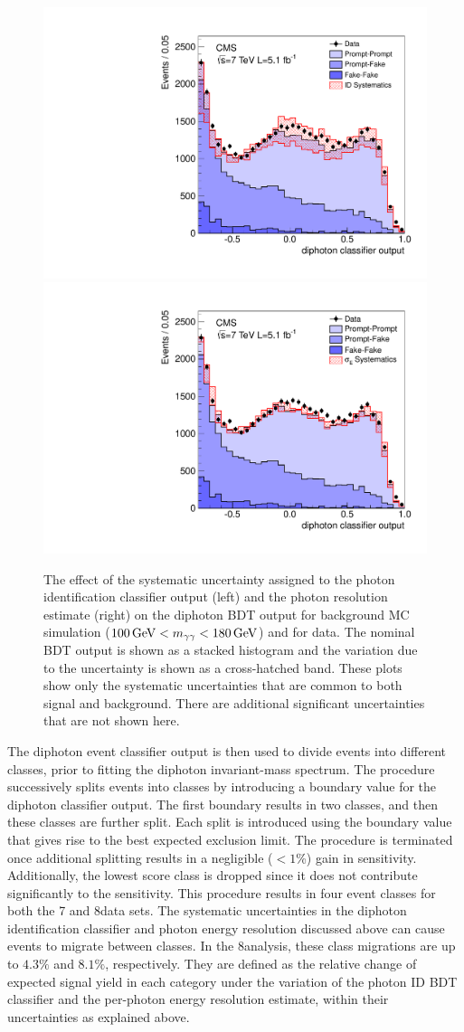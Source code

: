 \documentclass[11pt,twoside,a4paper,cmspaper,final,collab]{cms-tdr}
\begin{document}
\begin{figure}[htbp]
  \begin{center}
    \includegraphics[width=0.49\linewidth]{figures/hgg_phmvanomid_7TeV}
    \includegraphics[width=0.49\linewidth]{figures/hgg_phmvanomsige_7TeV}
    \caption{
      The effect of the systematic uncertainty assigned to the photon
      identification classifier output (left) and
      the photon resolution estimate (right)
      on the diphoton BDT output for background MC simulation ($100\,\text{Ge\hspace{-.08em}V}<m_{\gamma\gamma}<180\,\text{Ge\hspace{-.08em}V}$) and for data.
      The nominal BDT output is shown as a stacked histogram and the variation due to the
      uncertainty is shown as a cross-hatched band. These plots show only the systematic uncertainties
      that are common to both signal and background. There are additional significant uncertainties
      that are not shown here.
    }
    \label{fig:hgg_dpmvavalidation}
  \end{center}
\end{figure}


The diphoton event classifier output is then used to
divide events into different classes, prior to fitting the diphoton invariant-mass spectrum.
The procedure successively splits events into classes by
introducing a boundary value for the diphoton classifier output. The first boundary results in two classes,
and then these classes are further split.
Each split is introduced using the boundary value that gives rise to
the best expected exclusion limit. The procedure is terminated once additional
splitting results in a negligible (${<}1$\%) gain in sensitivity.
Additionally, the lowest score class is dropped since it does not
contribute significantly to the sensitivity. This procedure results
in four event classes for both the 7 and 8\TeV data sets. The systematic
uncertainties  in  the diphoton identification classifier and photon energy resolution
discussed above can cause
events to migrate between classes. In the 8\TeV analysis,
these class migrations are up to
$4.3\%$ and $8.1\%$, respectively. They are defined as the relative change of expected signal yield in
each category under the variation of the photon ID BDT classifier and the per-photon energy resolution estimate,
within their uncertainties as explained above.
\end{document}
